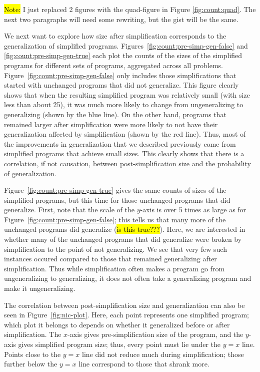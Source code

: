 \hl{Note:} I just replaced 2 figures with the quad-figure in Figure \ref{fig:count:quad}. The next two paragraphs will need some rewriting, but the gist will be the same.

We next want to explore how size after simplification corresponds to the generalization of simplified programs. Figures~\ref{fig:count:pre-simp-gen-false} and \ref{fig:count:pre-simp-gen-true} each plot the counts of the sizes of the simplified programs for different sets of programs, aggregated across all problems. Figure~\ref{fig:count:pre-simp-gen-false} only includes those simplifications that started with unchanged programs that did not generalize. This figure clearly shows that when the resulting simplified program was relatively small (with size less than about 25), it was much more likely to change from ungeneralizing to generalizing (shown by the blue line). On the other hand, programs that remained larger after simplification were more likely to not have their generalization affected by simplification (shown by the red line). Thus, most of the improvements in generalization that we described previously come from simplified programs that achieve small sizes. This clearly shows that there is a correlation, if not causation, between post-simplification size and the probability of generalization.

Figure~\ref{fig:count:pre-simp-gen-true} gives the same counts of sizes of the simplified programs, but this time for those unchanged programs that did generalize. First, note that the scale of the $y$-axis is over 5 times as large as for Figure~\ref{fig:count:pre-simp-gen-false}; this tells us that many more of the unchanged programs did generalize (\hl{is this true???}). Here, we are interested in whether many of the unchanged programs that did generalize were broken by simplification to the point of not generalizing. We see that very few such instances occured compared to those that remained generalizing after simplification. Thus while simplification often makes a program go from ungeneralizing to generalizing, it does not often take a generalizing program and make it ungeneralizing.

The correlation between post-simplification size and generalization can also be seen in Figure~\ref{fig:nic-plot}. Here, each point represents one simplified program; which plot it belongs to depends on whether it generalized before or after simplification. The $x$-axis gives pre-simplification size of the program, and the $y$-axis gives simplified program size; thus, every point must lie under the $y = x$ line. Points close to the $y = x$ line did not reduce much during simplification; those further below the $y = x$ line correspond to those that shrank more.

